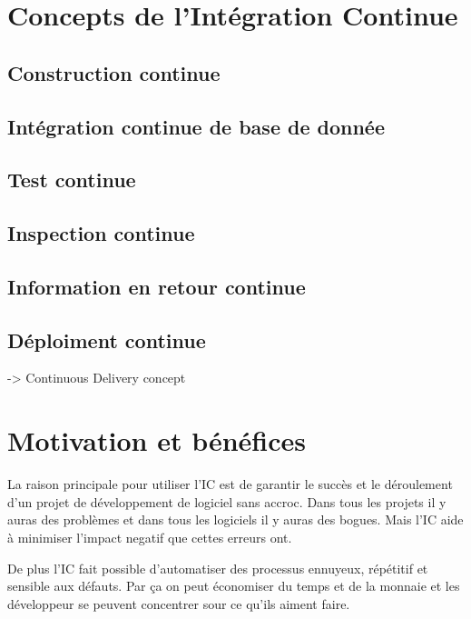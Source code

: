 \section{Concepts de l'Intégration Continue}

\subsection{Construction continue}

\subsection{Intégration continue de base de donnée}

\subsection{Test continue}

\subsection{Inspection continue}

\subsection{Information en retour continue}

\subsection{Déploiment continue}

-> Continuous Delivery concept



\clearpage

\section{Motivation et bénéfices}

La raison principale pour utiliser l'IC est de garantir le succès et le déroulement d'un projet de développement de logiciel sans accroc. Dans tous les projets il y auras des problèmes et dans tous les logiciels il y auras des bogues. Mais l'IC aide à minimiser l'impact negatif que cettes erreurs ont.

De plus l'IC fait possible d'automatiser des processus ennuyeux, répétitif et sensible aux défauts. Par ça on peut économiser du temps et de la monnaie et les développeur se peuvent concentrer sour ce qu'ils aiment faire.

